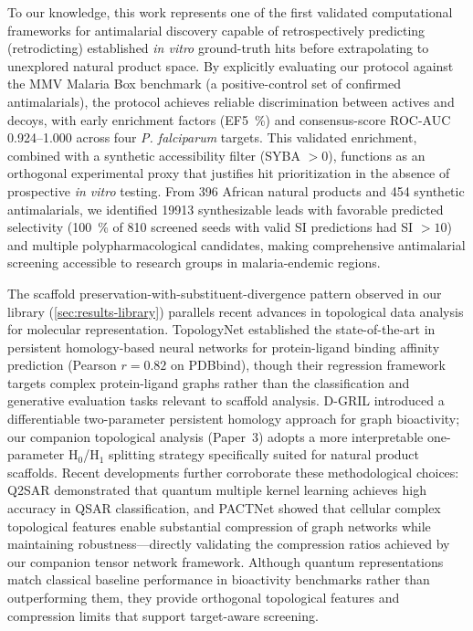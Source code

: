 \documentclass[journal=jcisd8,manuscript=article]{achemso}
\begin{document}
To our knowledge, this work represents one of the first validated computational frameworks for antimalarial discovery capable of retrospectively predicting (retrodicting) established \textit{in vitro} ground-truth hits before extrapolating to unexplored natural product space. By explicitly evaluating our protocol against the MMV Malaria Box benchmark (a positive-control set of confirmed antimalarials), the protocol achieves reliable discrimination between actives and decoys, with early enrichment factors (EF\qty{5}{\percent}) and consensus-score ROC-AUC \numrange{0.924}{1.000} across four \textit{P. falciparum} targets. This validated enrichment, combined with a synthetic accessibility filter (SYBA $> \num{0}$), functions as an orthogonal experimental proxy that justifies hit prioritization in the absence of prospective \textit{in vitro} testing. From \num{396} African natural products and \num{454} synthetic antimalarials, we identified \num{19913} synthesizable leads with favorable predicted selectivity (\qty{100}{\percent} of \num{810} screened seeds with valid SI predictions had SI $>\num{10}$) and multiple polypharmacological candidates, making comprehensive antimalarial screening accessible to research groups in malaria-endemic regions.

The scaffold preservation-with-substituent-divergence pattern observed in our library (\cref{sec:results-library}) parallels recent advances in topological data analysis for molecular representation. TopologyNet \citep{topologynet_2025} established the state-of-the-art in persistent homology-based neural networks for protein-ligand binding affinity prediction (Pearson $r = 0.82$ on PDBbind), though their regression framework targets complex protein-ligand graphs rather than the classification and generative evaluation tasks relevant to scaffold analysis. D-GRIL \citep{dgril_2026} introduced a differentiable two-parameter persistent homology approach for graph bioactivity; our companion topological analysis (Paper~3) adopts a more interpretable one-parameter H$_0$/H$_1$ splitting strategy specifically suited for natural product scaffolds. Recent developments further corroborate these methodological choices: Q2SAR \citep{q2sar_2025} demonstrated that quantum multiple kernel learning achieves high accuracy in QSAR classification, and PACTNet \citep{pactnet_2025} showed that cellular complex topological features enable substantial compression of graph networks while maintaining robustness---directly validating the compression ratios achieved by our companion tensor network framework. Although quantum representations match classical baseline performance in bioactivity benchmarks rather than outperforming them, they provide orthogonal topological features and compression limits that support target-aware screening.
\end{document}
